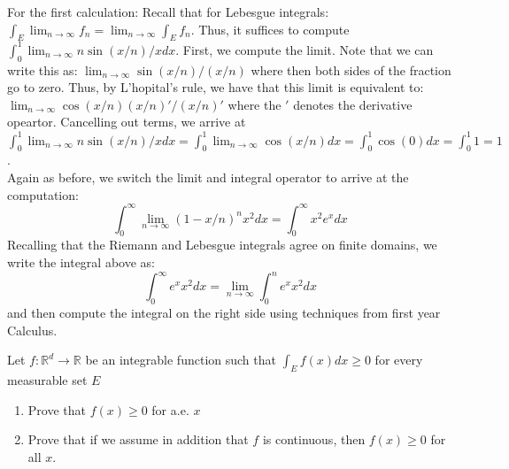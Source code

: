 \documentclass[12pt]{article}
\newcommand{\R}{\mathbb{R}}
\newenvironment{solution}[2][Solution]{\begin{trivlist}
\item[\hskip \labelsep {\bfseries #1}]}{\end{trivlist}}
\newenvironment{problem}[2][Problem]{\begin{trivlist}
\item[\hskip \labelsep {\bfseries #1}\hskip \labelsep {\bfseries #2.}]}{\end{trivlist}}
\begin{document}
\begin{solution}
    FFor the first calculation: Recall that for Lebesgue integrals: $\int_E \lim_{n\to\infty} f_n = \lim_{n\to\infty} \int_E f_n$.
    Thus, it suffices to compute $\int_0^1 \lim_{n\to\infty} n\sin(x/n)/xdx$. First, we compute the limit. Note that we can write
    this as: $\lim_{n\to\infty} \sin(x/n)/(x/n)$ where then both sides of the fraction go to zero. Thus, by L'hopital's rule,
    we have that this limit is equivalent to: $\lim_{n\to\infty} \cos(x/n)(x/n)'/(x/n)'$ where the $'$ denotes the derivative opeartor.
    Cancelling out terms, we arrive at $\int_0^1 \lim_{n\to\infty} n\sin(x/n)/xdx = \int_0^1 \lim_{n\to\infty} \cos(x/n)dx =
    \int_0^1 \cos(0)dx = \int_0^1 1 = 1$.\\

    Again as before, we switch the limit and integral operator to arrive at the computation:
    \[ \int_0^{\infty} \lim_{n\to\infty} (1-x/n)^n x^2dx = \int_0^{\infty} x^2e^xdx \]
    Recalling that the Riemann and Lebesgue integrals agree on finite domains, we write the integral above as:
    \[ \int_0^{\infty} e^xx^2dx = \lim_{n\to\infty} \int_0^n e^xx^2dx \]
    and then compute the integral on the right side using techniques from first year Calculus.
\end{solution}
\pagebreak

\begin{problem}{6}
    Let $f:\R^d\to\R$ be an integrable function such that $\int_E f(x)dx \geq 0$ for every measurable set $E$
    \begin{enumerate}
        \item Prove that $f(x)\geq 0$ for a.e. $x$
        \item Prove that if we assume in addition that $f$ is continuous, then $f(x)\geq 0$ for all $x$.
    \end{enumerate}
\end{problem}
\end{document}
